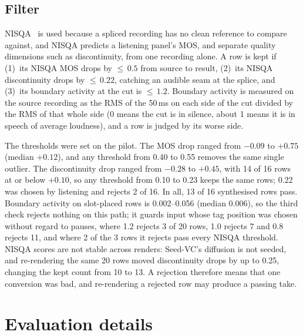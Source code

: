 \documentclass{article} %
\begin{document}
\subsection{Filter}
NISQA~\citep{nisqa} is used because a spliced recording has no clean reference to compare
against, and NISQA predicts a listening panel's MOS, and separate quality dimensions such as
discontinuity, from one recording alone. A row is kept if (1)~its NISQA MOS drops by
${\le}\,0.5$ from source to result, (2)~its NISQA discontinuity drops by ${\le}\,0.22$, catching
an audible seam at the splice, and (3)~its boundary activity at the cut is ${\le}\,1.2$.
Boundary activity is measured on the source recording as the RMS of the 50\,ms on each side of
the cut divided by the RMS of that whole side (0 means the cut is in silence, about 1 means it
is in speech of average loudness), and a row is judged by its worse side.

The thresholds were set on the pilot. The MOS drop ranged from $-0.09$ to $+0.75$ (median
$+0.12$), and any threshold from 0.40 to 0.55 removes the same single outlier. The discontinuity
drop ranged from $-0.28$ to $+0.45$, with 14 of 16 rows at or below $+0.10$, so any threshold
from 0.10 to 0.23 keeps the same rows; 0.22 was chosen by listening and rejects 2 of 16. In all,
13 of 16 synthesised rows pass. Boundary activity on slot-placed rows is 0.002--0.056 (median
0.006), so the third check rejects nothing on this path; it guards input whose tag position was
chosen without regard to pauses, where 1.2 rejects 3 of 20 rows, 1.0 rejects 7 and 0.8 rejects
11, and where 2 of the 3 rows it rejects pass every NISQA threshold. NISQA scores are not stable
across renders: Seed-VC's diffusion is not seeded, and re-rendering the same 20 rows moved
discontinuity drops by up to 0.25, changing the kept count from 10 to 13. A rejection therefore
means that one conversion was bad, and re-rendering a rejected row may produce a passing take.

\section{Evaluation details}\label{app:eval}
\end{document}
